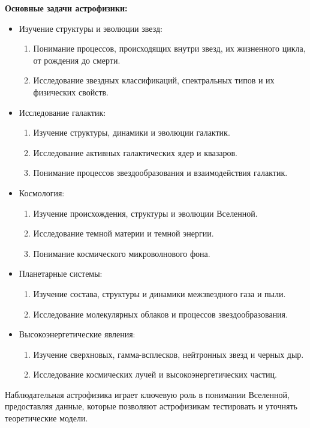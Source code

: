 \documentclass[12pt]{article}
\begin{document}
		\textbf{Основные задачи астрофизики:}
	\begin{itemize}
		\item	Изучение структуры и эволюции звезд:
			\begin{enumerate}
				\item Понимание процессов, происходящих внутри звезд, их жизненного цикла, от рождения до смерти.
				\item Исследование звездных классификаций, спектральных типов и их физических свойств.
			\end{enumerate}
		
		
		\item Исследование галактик:
			\begin{enumerate}
				\item 	Изучение структуры, динамики и эволюции галактик.
				\item 	Исследование активных галактических ядер и квазаров.
				\item 	Понимание процессов звездообразования и взаимодействия галактик.
			\end{enumerate}
		\item Космология:
			\begin{enumerate}
				\item 	Изучение происхождения, структуры и эволюции Вселенной.
				\item 	Исследование темной материи и темной энергии.
				
				\item 	Понимание космического микроволнового фона.
			\end{enumerate}
		\item Планетарные системы:
			\begin{enumerate}
				\item 	Изучение состава, структуры и динамики межзвездного газа и пыли.
				\item 	Исследование молекулярных облаков и процессов звездообразования.
			\end{enumerate}
		\item Высокоэнергетические явления:
		\begin{enumerate}
			\item 	Изучение сверхновых, гамма-всплесков, нейтронных звезд и черных дыр.
			\item Исследование космических лучей и высокоэнергетических частиц.
		\end{enumerate}
	\end{itemize}
	Наблюдательная астрофизика играет ключевую роль в понимании Вселенной, предоставляя данные, которые позволяют астрофизикам тестировать и уточнять теоретические модели.
	
\end{document}
